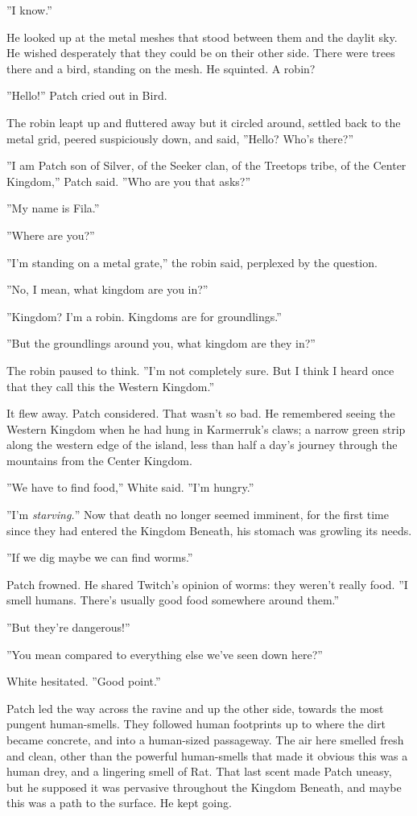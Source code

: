 \documentclass[12pt]{book}
\begin{document}
''I know.''

He looked up at the metal meshes that stood between them and the daylit sky. He wished desperately that they could be on their other side. There were trees there %
and a bird, standing on the mesh. He squinted. A robin?

''Hello!'' Patch cried out in Bird.

The robin leapt up and fluttered away %
but it circled around, settled back to the metal grid, peered suspiciously down, and said, ''Hello? Who's there?''

''I am Patch son of Silver, of the Seeker clan, of the Treetops tribe, of the Center Kingdom,'' Patch said. ''Who are you that asks?''

''My name is Fila.''

''Where are you?''

''I'm standing on a metal grate,'' the robin said, perplexed by the question.

''No, I mean, what kingdom are you in?''

''Kingdom? I'm a robin. Kingdoms are for groundlings.''

''But the groundlings around you, what kingdom are they in?''

The robin paused to think. ''I'm not completely sure. But I think I heard once that they call this the Western Kingdom.''

It flew away. Patch considered. That wasn't so bad. He remembered seeing the Western Kingdom when he had hung in Karmerruk's claws; a narrow green strip along the western edge of the island, less than half a day's journey through the mountains from the Center Kingdom.

''We have to find food,'' White said. ''I'm hungry.''

''I'm {\it starving.}'' Now that death no longer seemed imminent, for the first time since they had entered the Kingdom Beneath, his stomach was growling its needs.

''If we dig maybe we can find worms.''

Patch frowned. He shared Twitch's opinion of worms: they weren't really food. ''I smell humans. There's usually good food somewhere around them.''

''But they're dangerous!''

''You mean compared to everything else we've seen down here?''

White hesitated. ''Good point.''

Patch led the way across the ravine and up the other side, towards the most pungent human-smells. They followed human footprints up to where the dirt became concrete, and into a human-sized passageway. The air here smelled fresh and clean, other than the powerful human-smells that made it obvious this was a human drey, and a lingering smell of Rat. That last scent made Patch uneasy, but he supposed it was pervasive throughout the Kingdom Beneath, and maybe this was a path to the surface. He kept going.
\end{document}
